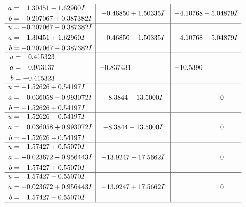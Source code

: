 \documentclass[1p]{elsarticle_modified}
\theoremstyle{definition}
\begin{document}
$$\begin{array}{c|c|c}
\begin{aligned}
a &= \phantom{-}1.30451 - 1.62960 I \\
b &= -0.207067 + 0.387382 I\end{aligned}
 & -0.46850 + 1.50335 I & -4.10768 - 5.04879 I \\ \hline\begin{aligned}
u &= -0.207067 - 0.387382 I \\
a &= \phantom{-}1.30451 + 1.62960 I \\
b &= -0.207067 - 0.387382 I\end{aligned}
 & -0.46850 - 1.50335 I & -4.10768 + 5.04879 I \\ \hline\begin{aligned}
u &= -0.415323\phantom{ +0.000000I} \\
a &= \phantom{-}0.953137\phantom{ +0.000000I} \\
b &= -0.415323\phantom{ +0.000000I}\end{aligned}
 & -0.837431\phantom{ +0.000000I} & -10.5390\phantom{ +0.000000I} \\ \hline\begin{aligned}
u &= -1.52626 + 0.54197 I \\
a &= \phantom{-}0.036058 - 0.993072 I \\
b &= -1.52626 + 0.54197 I\end{aligned}
 & -8.3844 + 13.5000 I & \phantom{-0.000000 } 0 \\ \hline\begin{aligned}
u &= -1.52626 - 0.54197 I \\
a &= \phantom{-}0.036058 + 0.993072 I \\
b &= -1.52626 - 0.54197 I\end{aligned}
 & -8.3844 - 13.5000 I & \phantom{-0.000000 } 0 \\ \hline\begin{aligned}
u &= \phantom{-}1.57427 + 0.55070 I \\
a &= -0.023672 - 0.956443 I \\
b &= \phantom{-}1.57427 + 0.55070 I\end{aligned}
 & -13.9247 - 17.5662 I & \phantom{-0.000000 } 0 \\ \hline\begin{aligned}
u &= \phantom{-}1.57427 - 0.55070 I \\
a &= -0.023672 + 0.956443 I \\
b &= \phantom{-}1.57427 - 0.55070 I\end{aligned}
 & -13.9247 + 17.5662 I & \phantom{-0.000000 } 0\\
 \hline 
 \end{array}$$\newpage\newpage\renewcommand{\arraystretch}{1}
\end{document}
